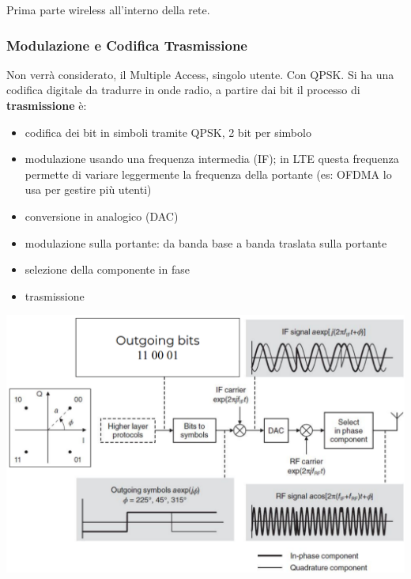 Prima parte wireless all'interno della rete.

\subsubsection{Modulazione e Codifica Trasmissione}

Non verrà considerato, il Multiple Access, singolo utente. Con QPSK. Si ha una codifica digitale da tradurre in onde radio, a partire dai bit il processo di \textbf{trasmissione} è:
\begin{itemize}
	\item codifica dei bit in simboli tramite QPSK, 2 bit per simbolo

	\item modulazione usando una frequenza intermedia (IF); in LTE questa frequenza permette di variare leggermente la frequenza della portante (es: OFDMA lo usa per gestire più utenti)

	\item conversione in analogico (DAC)

	\item modulazione sulla portante: da banda base a banda traslata sulla portante

	\item selezione della componente in fase 

	\item trasmissione
\end{itemize}

\begin{center}
	\includegraphics[width=0.9\linewidth]{img/4g/mightbesending}
\end{center}

